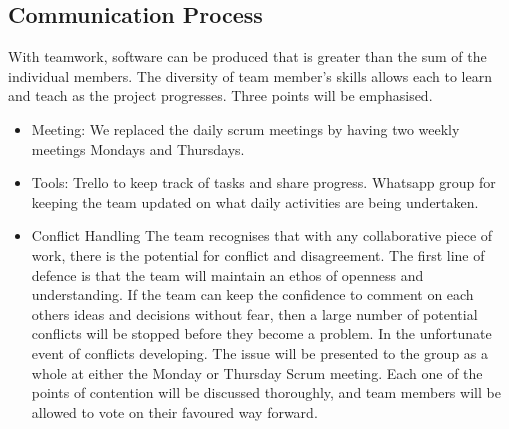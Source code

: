 \documentclass[11pt]{article}
\begin{document}
\subsection{Communication Process}
With teamwork, software can be produced that is greater than the sum of the individual members. The diversity of team member's skills allows each to learn and teach as the project progresses. Three points will be emphasised.
  \begin{itemize}
  	\item Meeting: We replaced the daily scrum meetings by having two weekly meetings Mondays and Thursdays.
 	\item Tools: Trello to keep track of tasks and share progress. Whatsapp group for keeping the team updated on what daily activities are being undertaken.
  	\item Conflict Handling
 \subitem The team recognises that with any collaborative piece of work, there is the potential for conflict and disagreement. The first line of defence is that the team will maintain an ethos of openness and understanding. If the team can keep the confidence to comment on each others ideas and decisions without fear, then a large number of potential conflicts will be stopped before they become a problem.
 \subitem In the unfortunate event of conflicts developing. The issue will be presented to the group as a whole at either the Monday or Thursday Scrum meeting. Each one of the points of contention will be discussed thoroughly, and team members will be allowed to vote on their favoured way forward.
  \end{itemize}
\end{document}
